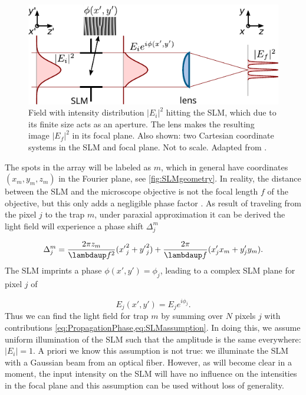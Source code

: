 \begin{figure}
    \centering
    \includegraphics[width = 13cm]{figures/SLMfigure.pdf}
    \caption{Field with intensity distribution $|E_i|^2$ hitting the SLM, which due to its finite size acts as an aperture.
    The lens makes the resulting image $|E_f|^2$ in its focal plane.
    Also shown: two Cartesian coordinate systems in the SLM and focal plane. 
    Not to scale. 
    Adapted from \cite{Labuhn2016}.}
    \label{fig:SLMLens}
\end{figure}

The spots in the array will be labeled as $m$, which in general have coordinates $(x_m, y_m, z_m)$ in the Fourier plane, see \cref{fig:SLMgeometry}.
In reality, the distance between the SLM and the microscope objective is not the focal length $f$ of the objective, but this only adds a negligible phase factor \cite{Bijnen2013}.
As result of traveling from the pixel $j$ to the trap $m$, under paraxial approximation it can be derived the light field will experience a phase shift $\Delta_j^m$ \cite{DiLeonardo2007}

\begin{equation}\label{eq:PropagationPhase}
    \Delta_j^m = 
    \frac{2\pi z_m}{\lambdaup f^2} ({x'}_{j}^{2} + {y'}_{j}^{2}) 
    + \frac{2\pi}{\lambdaup f}(x'_j x_m + y'_j y_m).
\end{equation}
The SLM imprints a phase $\phi(x',y') = \phi_j$, leading to a complex SLM plane for pixel $j$ of

\begin{equation}\label{eq:SLMassumption}
    E_j(x',y') = E_j e^{i \phi_j}.
\end{equation}
Thus we can find the light field for trap $m$ by summing over $N$ pixels $j$ with contributions \cref{eq:PropagationPhase,eq:SLMassumption}.
In doing this, we assume uniform illumination of the SLM such that the amplitude is the same everywhere: $|E_i| = 1$.
A priori we know this assumption is not true: we illuminate the SLM with a Gaussian beam from an optical fiber.
However, as will become clear in a moment, the input intensity on the SLM will have no influence on the intensities in the focal plane and this assumption can be used without loss of generality.

